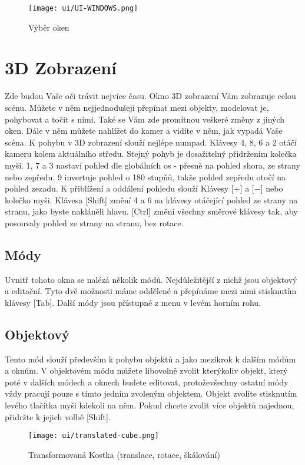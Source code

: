 \documentclass[12pt,a4paper]{report}
\begin{document}
	\begin{figure}[h]
		\centering
		\texttt{[image: ui/UI-WINDOWS.png]}
		\caption{Výběr oken}
		\label{pic:windows-selection}
	\end{figure}

	\section{3D Zobrazení}
	
	Zde budou Vaše oči trávit nejvíce času. Okno 3D zobrazení Vám zobrazuje
celou scénu. Můžete v něm nejjednodušeji přepínat mezi objekty,
modelovat je, pohybovat a točit s nimi. Také se Vám zde promítnou
veškeré změny z jiných oken. Dále v něm můžete nahlížet do kamer
a vidíte v něm, jak vypadá Vaše scéna.
K pohybu v 3D zobrazení slouží nejlépe numpad. Klávesy 4, 8, 6 a 2 otáčí
	kameru kolem aktuálního středu. Stejný pohyb je dosažitelný přidržením
kolečka myši. 1, 7 a 3 nastaví pohled dle globálních os - přesně na pohled
shora, ze strany nebo zepředu. 9 invertuje pohled o 180 stupňů, takže pohled
zepředu otočí na pohled zezadu. K přiblížení a oddálení pohledu slouží
Klávesy [$+$] a [$-$] nebo kolečko myši.
Klávesa [Shift] změní 4 a 6 na klávesy otáčející pohled ze strany na
stranu, jako byste nakláněli hlavu. [Ctrl] změní všechny směrové klávesy
tak, aby posouvaly pohled ze strany na stranu, bez rotace.
	
	\subsection{Módy}
	Uvnitř tohoto okna se nalézá několik módů. Nejdůležitější z nichž jsou
	objektový a editační. Tyto dvě možnosti máme oddělené a přepínáme
	mezi nimi stisknutím klávesy [Tab]. Další módy jsou přístupné z menu
	v levém horním rohu.
	
	\subsection{Objektový}
	Tento mód slouží především k pohybu objektů a jako mezikrok k dalším
	módům a oknům. V objektovém módu můžete libovolně zvolit kterýkoliv
	objekt, který poté v dalších módech a oknech budete editovat, protoževšechny ostatní módy vždy pracují pouze s tímto jedním zvoleným
objektem.
	Objekt zvolíte stisknutím levého tlačítka myši kdekoli na něm.
	Pokud chcete zvolit více objektů najednou, přidržte k jejich volbě [Shift].
	
	\begin{figure}[h]
		\centering
		\texttt{[image: ui/translated-cube.png]}
		\caption{Transformovaná Kostka (translace, rotace, škálování)}
		\label{pic:cube-positioning}
	\end{figure}
\end{document}
